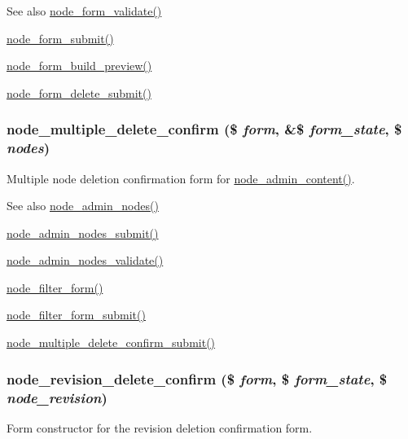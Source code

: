 \begin{DoxySeeAlso}{See also}
\hyperlink{node_8pages_8inc_aedf9f810594bc4c402a92cb197930bd9}{node\_\-form\_\-validate()} 

\hyperlink{node_8pages_8inc_addb125e26be73cec8769d2e729d7aa2c}{node\_\-form\_\-submit()} 

\hyperlink{node_8pages_8inc_a71425b02d4c0dd3af239bffdd7e1649b}{node\_\-form\_\-build\_\-preview()} 

\hyperlink{node_8pages_8inc_a5cdd62f89098801ac87b85d8c61e7ee2}{node\_\-form\_\-delete\_\-submit()} 
\end{DoxySeeAlso}
\hypertarget{group__forms_ga25cc06a5aa3aa17eadc5a8a97e7c5e9e}{
\subsubsection[{node\_\-multiple\_\-delete\_\-confirm}]{\setlength{\rightskip}{0pt plus 5cm}node\_\-multiple\_\-delete\_\-confirm (\$ {\em form}, \/  \&\$ {\em form\_\-state}, \/  \$ {\em nodes})}}
\label{group__forms_ga25cc06a5aa3aa17eadc5a8a97e7c5e9e}
Multiple node deletion confirmation form for \hyperlink{group__forms_ga9e864b6f961a37906f23989987913091}{node\_\-admin\_\-content()}.

\begin{DoxySeeAlso}{See also}
\hyperlink{group__forms_ga3fb56c702a3c16eddd2fcd8ccd3e4adb}{node\_\-admin\_\-nodes()} 

\hyperlink{node_8admin_8inc_a5f159cfed0d6cce65d5d70747efec391}{node\_\-admin\_\-nodes\_\-submit()} 

\hyperlink{node_8admin_8inc_a32a9ea91250aaf84de44f784a3569944}{node\_\-admin\_\-nodes\_\-validate()} 

\hyperlink{group__forms_ga2b7edb82b488db11ffde4fa60958004d}{node\_\-filter\_\-form()} 

\hyperlink{node_8admin_8inc_a346f00ebb9b4aae36025623d893c5061}{node\_\-filter\_\-form\_\-submit()} 

\hyperlink{node_8admin_8inc_ab8a2e11edeef2797ca739f94d1eb1af9}{node\_\-multiple\_\-delete\_\-confirm\_\-submit()} 
\end{DoxySeeAlso}
\hypertarget{group__forms_gae46b8603fe31b65546854c92d5923b68}{
\subsubsection[{node\_\-revision\_\-delete\_\-confirm}]{\setlength{\rightskip}{0pt plus 5cm}node\_\-revision\_\-delete\_\-confirm (\$ {\em form}, \/  \$ {\em form\_\-state}, \/  \$ {\em node\_\-revision})}}
\label{group__forms_gae46b8603fe31b65546854c92d5923b68}
Form constructor for the revision deletion confirmation form.

